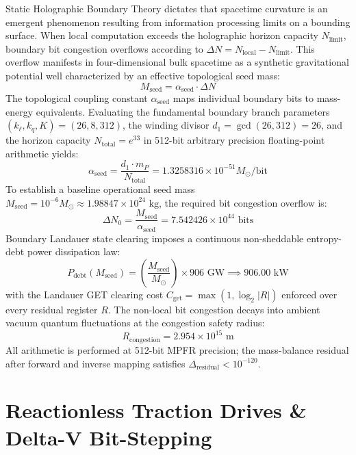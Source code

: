 \documentclass[twocolumn,aps,pra,floatfix,superscriptaddress,10pt]{revtex4-2}
\begin{document}
Static Holographic Boundary Theory dictates that spacetime curvature is an emergent phenomenon resulting from information processing limits on a bounding surface. When local computation exceeds the holographic horizon capacity $N_{\text{limit}}$, boundary bit congestion overflows according to $\Delta N = N_{\text{local}} - N_{\text{limit}}$. This overflow manifests in four-dimensional bulk spacetime as a synthetic gravitational potential well characterized by an effective topological seed mass:
\begin{equation}
M_{\text{seed}} = \alpha_{\text{seed}} \cdot \Delta N
\end{equation}
The topological coupling constant $\alpha_{\text{seed}}$ maps individual boundary bits to mass-energy equivalents. Evaluating the fundamental boundary branch parameters $(k_\ell, k_q, K) = (26, 8, 312)$, the winding divisor $d_1 = \gcd(26, 312) = 26$, and the horizon capacity $N_{\text{total}} = e^{33}$ in 512-bit arbitrary precision floating-point arithmetic yields:
\begin{equation}
\alpha_{\text{seed}} = \frac{d_1 \cdot m_P}{N_{\text{total}}} = 1.3258316 \times 10^{-51} M_\odot/\text{bit}
\end{equation}
To establish a baseline operational seed mass $M_{\text{seed}} = 10^{-6} M_\odot \approx 1.98847 \times 10^{24}\text{ kg}$, the required bit congestion overflow is:
\begin{equation}
\Delta N_0 = \frac{M_{\text{seed}}}{\alpha_{\text{seed}}} = 7.542426 \times 10^{44}\text{ bits}
\end{equation}
Boundary Landauer state clearing imposes a continuous non-sheddable entropy-debt power dissipation law:
\begin{equation}
P_{\text{debt}}(M_{\text{seed}}) = \left( \frac{M_{\text{seed}}}{M_\odot} \right) \times 906\text{ GW} \implies 906.00\text{ kW}
\end{equation}
with the Landauer GET clearing cost $C_{\text{get}} = \max(1, \log_2 |R|)$ enforced over every residual register $R$. The non-local bit congestion decays into ambient vacuum quantum fluctuations at the congestion safety radius:
\begin{equation}
R_{\text{congestion}} = 2.954 \times 10^{15}\text{ m}
\end{equation}
All arithmetic is performed at 512-bit MPFR precision; the mass-balance residual after forward and inverse mapping satisfies $\Delta_{\text{residual}} < 10^{-120}$.

\section{Reactionless Traction Drives \& Delta-V Bit-Stepping}
\end{document}
